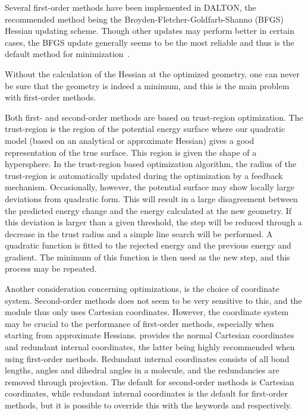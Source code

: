 Several first-order methods have been implemented in DALTON, the
recommended method being the Broyden-Fletcher-Goldfarb-Shanno (BFGS)
Hessian updating
scheme. Though other updates may perform better in
certain cases, the BFGS update generally seems to be the most
reliable and thus is the default method for minimization~\cite{vbthjcp117}.

Without the calculation of the Hessian at the optimized geometry, one
can never be sure that the geometry is indeed a minimum, and this is the
main problem with first-order methods.

Both first- and second-order methods are based on
trust-region
optimization. The trust-region is the region of the potential energy
surface where our quadratic model (based on an analytical or
approximate Hessian) gives a good representation of the true
surface. This region is given the shape of a
hypersphere. In the trust-region based optimization algorithm, the
radius of the trust-region is
automatically updated during the optimization by a feedback mechanism.
Occasionally, however, the potential surface may show locally large
deviations from quadratic form. This will result in a large
disagreement between the predicted energy change and the energy
calculated at the new geometry. If this deviation is larger than a
given threshold, the step will be reduced through a decrease in the
trust radius and a simple line search will be performed. A quadratic
function is fitted 
to the rejected energy and the previous energy and gradient. The
minimum of this function is then used as the new step, and this
process may be repeated.

Another consideration concerning optimizations, is the choice of
coordinate system. Second-order methods does not seem to be very
sensitive to this, and the  module thus only uses
Cartesian coordinates. However, the coordinate system may be crucial
to the performance of first-order methods, especially when starting
from approximate Hessians.  provides the normal Cartesian
coordinates
and redundant internal coordinates,
the latter being highly recommended when using
first-order methods. Redundant internal coordinates consists of all
bond lengths, angles and dihedral angles in a molecule, and the
redundancies are removed through projection. The default for
second-order methods is Cartesian coordinates, while redundant
internal coordinates is the default for first-order methods, but it is
possible to override this with the keywords  and
 respectively.

